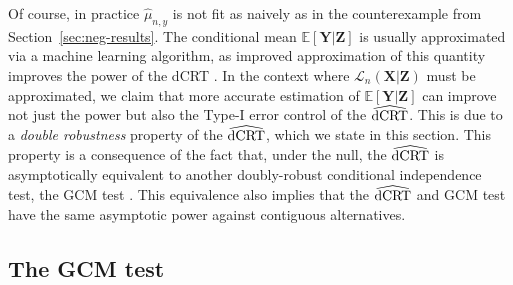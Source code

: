 \documentclass[12pt]{article}
\theoremstyle{definition}
\theoremstyle{remark}
\newcommand{\E}{\mathbb E}								%
\newcommand{\prx}{\bm X}								%
\newcommand{\prz}{\bm Z}								%
\newcommand{\pry}{{\bm Y}}								%
\newcommand{\law}{\mathcal L}							%
\newcommand{\dCRThat}{\widehat{\textnormal{dCRT}}}		%
\begin{document}
	Of course, in practice $\widehat \mu_{n,y}$ is not fit as naively as in the counterexample from Section~\ref{sec:neg-results}. The conditional mean $\E[\pry|\prz]$ is usually approximated via a machine learning algorithm, as improved approximation of this quantity improves the power of the dCRT \citep{Katsevich2020a}. In the context where $\law_n(\prx|\prz)$ must be approximated, we claim that more accurate estimation of $\E[\pry|\prz]$ can improve not just the power but also the Type-I error control of the $\dCRThat$. This is due to a \textit{double robustness} property of the $\dCRThat$, which we state in this section. This property is a consequence of the fact that, under the null, the $\dCRThat$ is asymptotically equivalent to another doubly-robust conditional independence test, the GCM test \citep{Shah2018}. This equivalence also implies that the $\dCRThat$ and GCM test have the same asymptotic power against contiguous alternatives.
	
	\subsection{The GCM test}
	
\end{document}
